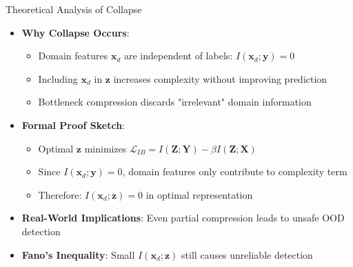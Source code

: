 \documentclass[aspectratio=169]{beamer}
\begin{document}
\begin{frame}{Theoretical Analysis of Collapse}
\begin{itemize}
    \item \textbf{Why Collapse Occurs}:
    \begin{itemize}
        \item Domain features $\mathbf{x}_d$ are independent of labels: $I(\mathbf{x}_d; \mathbf{y}) = 0$
        \item Including $\mathbf{x}_d$ in $\mathbf{z}$ increases complexity without improving prediction
        \item Bottleneck compression discards "irrelevant" domain information
    \end{itemize}
    \item \textbf{Formal Proof Sketch}:
    \begin{itemize}
        \item Optimal $\mathbf{z}$ minimizes $\mathcal{L}_{IB} = I(\mathbf{Z}; \mathbf{Y}) - \beta I(\mathbf{Z}; \mathbf{X})$
        \item Since $I(\mathbf{x}_d; \mathbf{y}) = 0$, domain features only contribute to complexity term
        \item Therefore: $I(\mathbf{x}_d; \mathbf{z}) = 0$ in optimal representation
    \end{itemize}
    \item \textbf{Real-World Implications}: Even partial compression leads to unsafe OOD detection
    \item \textbf{Fano's Inequality}: Small $I(\mathbf{x}_d; \mathbf{z})$ still causes unreliable detection
\end{itemize}
\end{frame}
\end{document}
